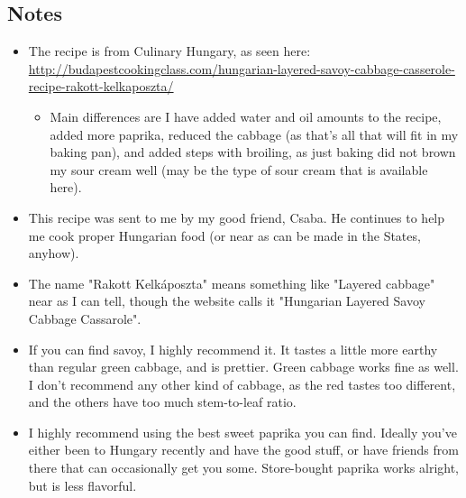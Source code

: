\begin{multicols}{2}
\subsection*{Notes}
\begin{itemize}
    \item The recipe is from Culinary Hungary, as seen here: \url{http://budapestcookingclass.com/hungarian-layered-savoy-cabbage-casserole-recipe-rakott-kelkaposzta/}
    \begin{itemize}
        \item Main differences are I have added water and oil amounts to the recipe, added more paprika, reduced the cabbage (as that's all that will fit in my baking pan), and added steps with broiling, as just baking did not brown my sour cream well (may be the type of sour cream that is available here).
    \end{itemize}
    \item This recipe was sent to me by my good friend, Csaba. He continues to help me cook proper Hungarian food (or near as can be made in the States, anyhow).
    \item The name "Rakott Kelkáposzta" means something like "Layered cabbage" near as I can tell, though the website calls it "Hungarian Layered Savoy Cabbage Cassarole".
    \item If you can find savoy, I highly recommend it. It tastes a little more earthy than regular green cabbage, and is prettier. Green cabbage works fine as well. I don't recommend any other kind of cabbage, as the red tastes too different, and the others have too much stem-to-leaf ratio.
    \item I highly recommend using the best sweet paprika you can find. Ideally you've either been to Hungary recently and have the good stuff, or have friends from there that can occasionally get you some. Store-bought paprika works alright, but is less flavorful.
\end{itemize}
\end{multicols}
\clearpage